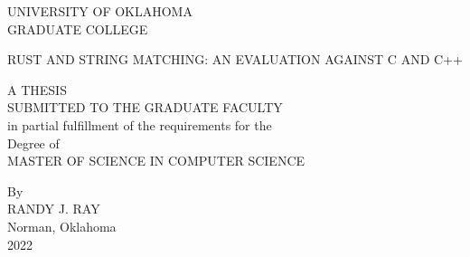 \thispagestyle{empty}
\begin{center}
UNIVERSITY OF OKLAHOMA \\
\medskip
GRADUATE COLLEGE \\

\vspace{2.0in}

RUST AND STRING MATCHING: AN EVALUATION AGAINST C AND C++  \\

\vspace{2.0in}

A THESIS \\
\medskip
SUBMITTED TO THE GRADUATE FACULTY \\
\medskip
in partial fulfillment of the requirements for the \\
\medskip
Degree of \\
\medskip
MASTER OF SCIENCE IN COMPUTER SCIENCE \\

\mbox{}
\vfill

By \\
\medskip
RANDY J. RAY \\
Norman, Oklahoma \\
2022 \\
\end{center}
\pagebreak
